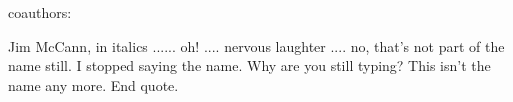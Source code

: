 
coauthors:


Jim McCann, in italics ...... oh! .... nervous laughter .... no, that's not part of the name still. I stopped saying the name. Why are you still typing? This isn't the name any more. End quote.

